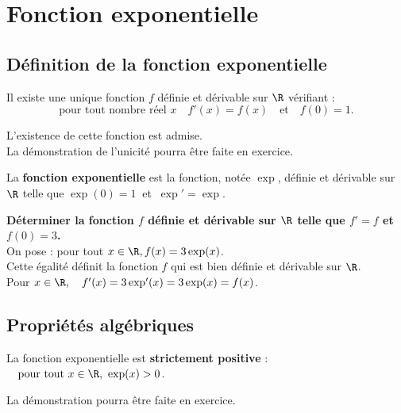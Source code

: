 \documentclass[a4paper,11pt,cours]{nsi} %
\begin{document}
\setcounter{chapter}{10} %

\chapter{Fonction exponentielle}

\section{Définition de la fonction exponentielle}
\begin{propriete}[]
	Il existe une unique fonction $f$ définie et dérivable sur $\R$ vérifiant : 
	$$\text{pour tout nombre réel }x  \quad f'(x)=f(x)\quad \text{et} \quad f(0)=1.$$
\end{propriete}
\begin{demonstration}
	L'existence de cette fonction est admise.\\
	La démonstration de l'unicité pourra être faite en exercice.
\end{demonstration}

\begin{definition}[ ]
	La \textbf{fonction exponentielle} est la fonction, notée $\exp$, définie et dérivable sur $\R$ telle que $\exp(0)=1 \ $ et $\ \exp'=\exp$.
\end{definition}

\begin{methode}[ ]
	\textbf{Déterminer la fonction $f$ définie et dérivable sur $\R$ telle que $f'=f$ et $f(0)=3$.}\\
	On pose : pour tout $x\in \R, f(x)=3\exp(x)$.\\
	Cette égalité définit la fonction $f$ qui est bien définie et dérivable sur $\R$.\\
	Pour $x\in \R, \quad f'(x)=3\exp'(x)=3\exp(x)=f(x)$.
\end{methode}


\section{Propriétés algébriques}
\begin{propriete}[ ]
	La fonction exponentielle est \textbf{strictement positive} : $\quad \text{pour tout } x\in \R,\ \exp(x)>0$.
\end{propriete}


\begin{demonstration}
	La démonstration pourra être faite en exercice.
\end{demonstration}
\end{document}
